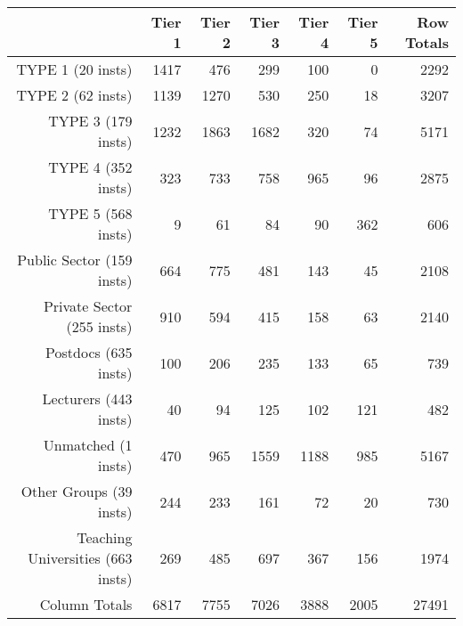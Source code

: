 \begin{tabular}{rrrrrrr}
  \hline
   & \textbf{Tier 1} & \textbf{Tier 2} & \textbf{Tier 3} & \textbf{Tier 4} & \textbf{Tier 5} & \textbf{Row Totals} \\\hline
  TYPE 1 (20 insts) & 1417 & 476 & 299 & 100 & 0 & 2292 \\
  TYPE 2 (62 insts) & 1139 & 1270 & 530 & 250 & 18 & 3207 \\
  TYPE 3 (179 insts) & 1232 & 1863 & 1682 & 320 & 74 & 5171 \\
  TYPE 4 (352 insts) & 323 & 733 & 758 & 965 & 96 & 2875 \\
  TYPE 5 (568 insts) & 9 & 61 & 84 & 90 & 362 & 606 \\
  Public Sector (159 insts) & 664 & 775 & 481 & 143 & 45 & 2108 \\
  Private Sector (255 insts) & 910 & 594 & 415 & 158 & 63 & 2140 \\
  Postdocs (635 insts) & 100 & 206 & 235 & 133 & 65 & 739 \\
  Lecturers (443 insts) & 40 & 94 & 125 & 102 & 121 & 482 \\
  Unmatched (1 insts) & 470 & 965 & 1559 & 1188 & 985 & 5167 \\
  Other Groups (39 insts) & 244 & 233 & 161 & 72 & 20 & 730 \\
  Teaching Universities (663 insts) & 269 & 485 & 697 & 367 & 156 & 1974 \\
  Column Totals & 6817 & 7755 & 7026 & 3888 & 2005 & 27491 \\\hline
\end{tabular}
